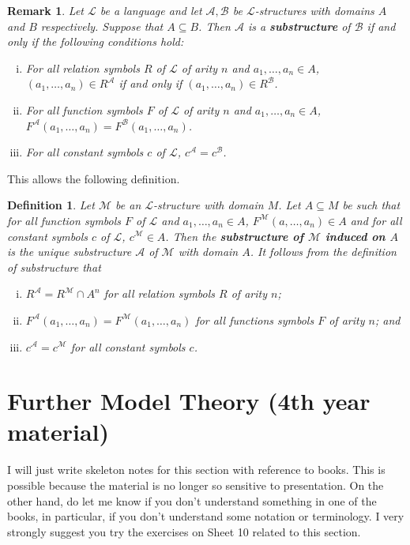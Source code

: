\documentclass[11pt]{article}
\newtheorem{remark}[theorem]{Remark}
\newtheorem{definition}[theorem]{Definition}
\newcommand{\mcal}[1]{\mathcal{#1}}
\begin{document}
\begin{remark}
Let $\mcal{L}$ be a language and let $\mcal{A},\mcal{B}$ be $\mcal{L}$-structures with domains $A$ and $B$ respectively. Suppose that $A\subseteq B$. Then $\mcal{A}$ is a \textbf{substructure} of $\mcal{B}$ if and only if the following conditions hold:
\begin{enumerate}[(i)]
\item For all relation symbols $R$ of $\mcal{L}$ of arity $n$ and $a_1,\ldots,a_n\in A$, $(a_1,\ldots,a_n)\in R^{\mcal{A}}$ if and only if $(a_1,\ldots,a_n)\in R^{\mcal{B}}$.
\item For all function symbols $F$ of $\mcal{L}$ of arity $n$ and $a_1,\ldots,a_n\in A$, $F^{\mcal{A}}(a_1,\ldots,a_n)=F^{\mcal{B}}(a_1,\ldots,a_n)$.
\item For all constant symbols $c$ of $\mcal{L}$, $c^{\mcal{A}}=c^{\mcal{B}}$.
\end{enumerate}
\end{remark}

This allows the following definition.

\begin{definition}
Let $\mcal{M}$ be an $\mcal{L}$-structure with domain $M$. Let $A\subseteq M$ be such that for all function symbols $F$ of $\mcal{L}$ and $a_1,\ldots,a_n\in A$, $F^{\mcal{M}}(a,\ldots,a_n)\in A$ and for all constant symbols $c$ of $\mcal{L}$, $c^{\mcal{M}}\in A$. Then the \textbf{substructure of $\mcal{M}$ induced on $A$} is the unique substructure $\mcal{A}$ of $\mcal{M}$ with domain $A$. It follows from the definition of substructure that
\begin{enumerate}[(i)]
\item $R^{\mcal{A}}=R^{\mcal{M}}\cap A^n$ for all relation symbols $R$ of arity $n$;
\item $F^{\mcal{A}}(a_1,\ldots,a_n)=F^{\mcal{M}}(a_1,\ldots,a_n)$ for all functions symbols $F$ of arity $n$; and
\item $c^{\mcal{A}}=c^{\mcal{M}}$ for all constant symbols $c$.
\end{enumerate}
\end{definition}


%
%
%
\section{Further Model Theory (4th year material)}

I will just write skeleton notes for this section with reference to books. This is possible because the material is no longer so sensitive to presentation. On the other hand, do let me know if you don't understand something in one of the books, in particular, if you don't understand some notation or terminology. I very strongly suggest you try the exercises on Sheet 10 related to this section.
\end{document}

